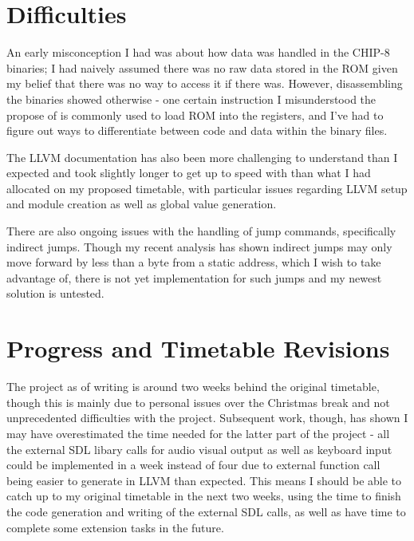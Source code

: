 \documentclass[12pt,a4paper,twoside]{article}
\begin{document}
\section*{Difficulties}
An early misconception I had was about how data was handled in the CHIP-8 binaries; I had naively assumed there was no raw data stored in the ROM given my belief that there was no way to access it if there was. However, disassembling the binaries showed otherwise - one certain instruction I misunderstood the propose of is commonly used to load ROM into the registers, and I've had to figure out ways to differentiate between code and data within the binary files.

The LLVM documentation has also been more challenging to understand than I expected and took slightly longer to get up to speed with than what I had allocated on my proposed timetable, with particular issues regarding LLVM setup and module creation as well as global value generation.

There are also ongoing issues with the handling of jump commands, specifically indirect jumps. Though my recent analysis has shown indirect jumps may only move forward by less than a byte from a static address, which I wish to take advantage of, there is not yet implementation for such jumps and my newest solution is untested.


\section*{Progress and Timetable Revisions}
The project as of writing is around two weeks behind the original timetable, though this is mainly due to personal issues over the Christmas break and not unprecedented difficulties with the project. Subsequent work, though, has shown I may have overestimated the time needed for the latter part of the project - all the external SDL libary calls for audio visual output as well as keyboard input could be implemented in a week instead of four due to external function call being easier to generate in LLVM than expected. This means I should be able to catch up to my original timetable in the next two weeks, using the time to finish the code generation and writing of the external SDL calls, as well as have time to complete some extension tasks in the future.
\end{document}
